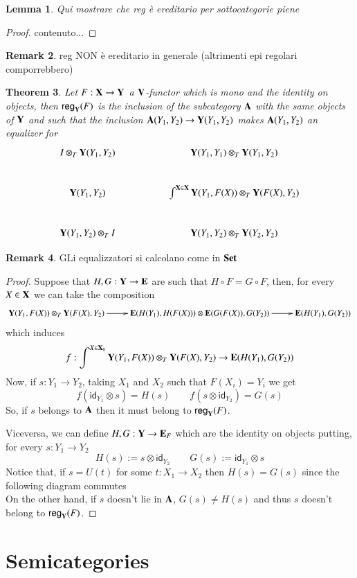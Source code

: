 \documentclass[12pt]{article}
\newtheorem{lemma}{Lemma}[section]
\newtheorem{theorem}[lemma]{Theorem}
\theoremstyle{definition}
\newtheorem{remark}[lemma]{Remark}
\def\A{\mathcal A}
\newcommand{\Set}{\textbf{\textup{Set}}}
\numberwithin{equation}{section}
\newcommand{\id}[1]{\mathsf{id}_{#1}}
\def\reg{\mathsf{reg}}
\def\A{\textbf {\textup{A}}}
\def\X{\textbf {\textup{X}}}
\def\V{\textbf {\textup{V}}}
\def\Y{\textbf {\textup{Y}}}
\def\e{\textbf {\textup{E}}}
\begin{document}
\begin{lemma}
Qui mostrare che reg è ereditario per sottocategorie piene
\end{lemma}
\begin{proof}
	contenuto...
\end{proof}

\begin{remark}
	reg NON è ereditario in generale (altrimenti epi regolari comporrebbero)
\end{remark}

\begin{theorem}\label{thm:mitch}
	Let $F:\X\to \Y$ a $\V$-functor which is mono and the identity on objects, then $\reg_{\Y}(F)$ is the inclusion of the subcategory $\A$ with the same objects of $\Y$ and such that the inclusion $\A(Y_1, Y_2)\to \Y(Y_1, Y_2)$ makes $\A(Y_1, Y_2)$ an equalizer for
	\[\xymatrix@C=50pt{ I \otimes_T \Y(Y_1, Y_2) & \Y(Y_1, Y_1)\otimes_T \Y(Y_1, Y_2)\\ 
		\Y(Y_1, Y_2)  & \int^{\X\in \X} \Y(Y_1, F(X) ) \otimes_T \Y(F(X),  Y_2) \\
		\Y(Y_1, Y_2)\otimes_T I & \Y(Y_1, Y_2) \otimes_T \Y(Y_2, Y_2)} \]
\end{theorem}

\begin{remark}
	GLi equalizzatori si calcolano come in $\Set$
\end{remark}

\begin{proof}
Suppose that $H, G:\Y\to \e$ are such that $H\circ F=G\circ F$, then, for every $X\in \X$ we can take the composition
\[\xymatrix{\Y(Y_1, F(X))\otimes_T \Y(F(X), Y_2)\ar[r] & \e(H(Y_1), H(F(X))) \otimes \e(G(F(X)), G(Y_2)) \ar[r] & \e(H(Y_1), G(Y_2))}\]
which induces 
\[f:\int^{X\in \X_0}\Y(Y_1, F(X))\otimes_T \Y(F(X), Y_2) \to \e(H(Y_1), G(Y_2))\]
Now, if $s:Y_1\to Y_2$, taking $X_1$ and $X_2$  such that $F(X_i)=Y_i$ we get 
\[f(\id{Y_1}\otimes s)=H(s) \qquad f(s\otimes \id{Y_2})=G(s)\]
So, if $s$ belongs to $\A$ then it must belong to $\reg_{\Y}(F)$.

Viceversa, we can define $H,G:\Y\to \e_F$ which are the identity on objects putting, for every $s:Y_1\to Y_2$
\[H(s):=s\otimes \id{Y_2} \qquad G(s):=\id{Y_1}\otimes s \]
Notice that, if $s=U(t)$ for some $t:X_1\to X_2$ then $H(s)=G(s)$  since the following diagram commutes
\[\]
On the other hand, if $s$ doesn't lie in $\A$, $G(s)\neq H(s)$ and thus $s$ doesn't belong to $\reg_{\Y}(F)$.
\end{proof}

\section{Semicategories}
\end{document}
